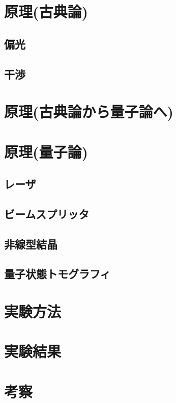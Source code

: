 \documentclass{report}
\begin{document}
  \maketitle
  \tableofcontents
  \chapter{原理(古典論)}
    \section{偏光}
      
    \section{干渉}
      
  \chapter{原理(古典論から量子論へ)}
    
  \chapter{原理(量子論)}
    \section{レーザ}
      
    \section{ビームスプリッタ}
      
    \section{非線型結晶}
      
    \section{量子状態トモグラフィ}
      
  \chapter{実験方法}
  \chapter{実験結果}
  \chapter{考察}
  \appendix
  
\end{document}
